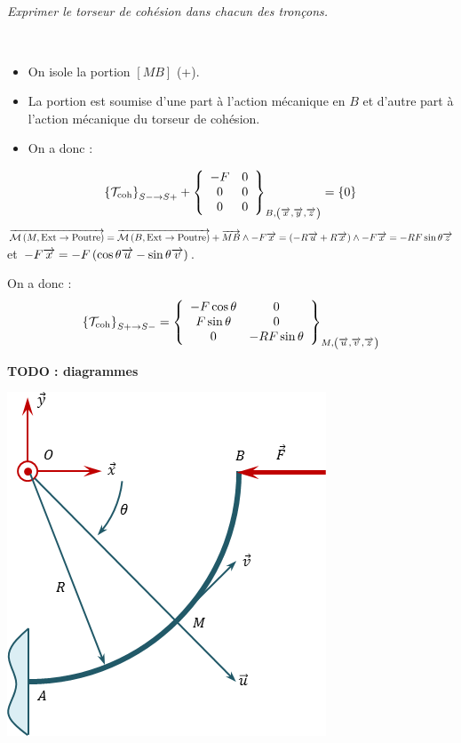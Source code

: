 \documentclass[10pt,fleqn]{article} %
\begin{document}
\begin{multicols}{2}
\subparagraph{}
\textit{Exprimer le torseur de cohésion dans chacun des tronçons.}
\ifprof
\begin{corrige}
 ~\\
\begin{itemize}[label=,font=\color{ocre}] 
\item On isole la portion $[MB]$ (+).
\item La portion est soumise d'une part à l'action mécanique en $B$ et d'autre part à l'action mécanique du torseur de cohésion.
\item On a donc : 
\end{itemize}
$$
\torseurscoh_{S-\rightarrow S+} +
 \torseurcol{-F}{0}{0}{0}{0}{0}{B,\left( \vect{x},\vect{y},\vect{z} \right)} 
 = \{0\}
$$
%
$\vectm{M}{\text{Ext}}{\text{Poutre}}
=\vectm{B}{\text{Ext}}{\text{Poutre}} + \vect{MB}  \wedge -F \vect{x} 
=\left( -R\vect{u} + R\vect{x}\right) \wedge -F \vect{x} 
=  - RF \sin \theta \vect{z}
$  et $-F \vect{x}  = -F \left( \cos \theta \vect{u}-\sin \theta \vect{v} \right) $.

On a donc :
$$
\torseurscoh_{S+\rightarrow S-} 
= 
 \torseurcol{-F\cos \theta }{F\sin \theta }{0}{0}{0}{ - RF \sin \theta}{M,\left( \vect{u},\vect{v},\vect{z} \right)} 
$$

\textbf{TODO : diagrammes}
\end{corrige}
\else 
\fi


\ifprof
\else
\begin{center}
\includegraphics[width=.4\textwidth]{images/exo_04}
\end{center}
\fi




\end{multicols}
\end{document}
